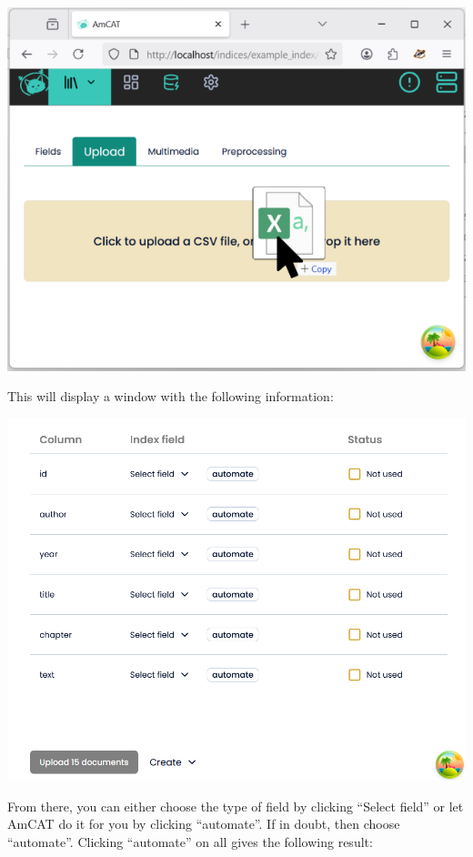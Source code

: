 \documentclass[
  letterpaper,
  DIV=11,
  numbers=noendperiod]{scrreprt}
\begin{document}
\includegraphics{media/amcat-3.1-6.png}

This will display a window with the following information:

\includegraphics{media/amcat-3.1-7.png}

From there, you can either choose the type of field by clicking ``Select
field'' or let AmCAT do it for you by clicking ``automate''. If in
doubt, then choose ``automate''. Clicking ``automate'' on all gives the
following result:
\end{document}
